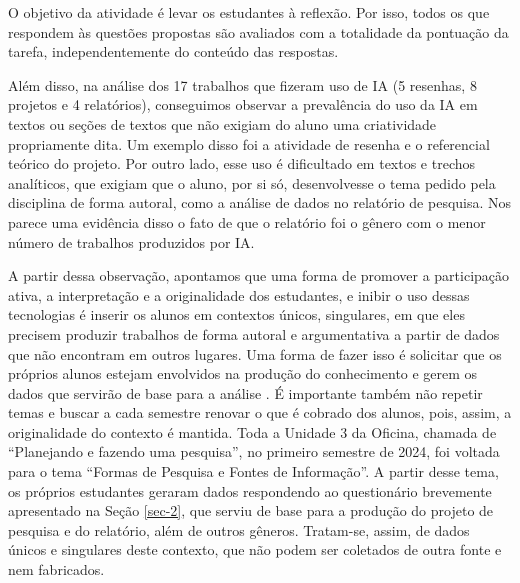 \documentclass[portuguese]{textolivre}
\begin{document}
O objetivo da atividade é levar os estudantes à reflexão. Por isso, todos os que respondem às questões propostas são avaliados com a totalidade da pontuação da tarefa, independentemente do conteúdo das respostas.

Além disso, na análise dos 17 trabalhos que fizeram uso de IA (5 resenhas, 8 projetos e 4 relatórios), conseguimos observar a prevalência do uso da IA em textos ou seções de textos que não exigiam do aluno uma criatividade propriamente dita. Um exemplo disso foi a atividade de resenha e o referencial teórico do projeto. Por outro lado, esse uso é dificultado em textos e trechos analíticos, que exigiam que o aluno, por si só, desenvolvesse o tema pedido pela disciplina de forma autoral, como a análise de dados no relatório de pesquisa. Nos parece uma evidência disso o fato de que o relatório foi o gênero com o menor número de trabalhos produzidos por IA.

A partir dessa observação, apontamos que uma forma de promover a participação ativa, a interpretação e a originalidade dos estudantes, e inibir o uso dessas tecnologias é inserir os alunos em contextos únicos, singulares, em que eles precisem produzir trabalhos de forma autoral e argumentativa a partir de dados que não encontram em outros lugares. Uma forma de fazer isso é solicitar que os próprios alunos estejam envolvidos na produção do conhecimento e gerem os dados que servirão de base para a análise \cite{amaral2025}. É importante também não repetir temas e buscar a cada semestre renovar o que é cobrado dos alunos, pois, assim, a originalidade do contexto é mantida. Toda a Unidade 3 da Oficina, chamada de ``Planejando e fazendo uma pesquisa'', no primeiro semestre de 2024, foi voltada para o tema ``Formas de Pesquisa e Fontes de Informação''. A partir desse tema, os próprios estudantes geraram dados respondendo ao questionário brevemente apresentado na Seção \ref{sec-2}, que serviu de base para a produção do projeto de pesquisa e do relatório, além de outros gêneros. Tratam-se, assim, de dados únicos e singulares deste contexto, que não podem ser coletados de outra fonte e nem fabricados.
\end{document}
